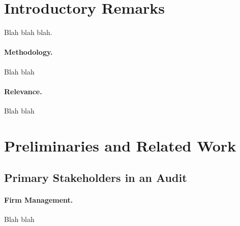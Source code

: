 \section{Introductory Remarks}

Blah blah blah.

 



\paragraph{\textbf{Methodology.}}  Blah blah
%
%
%
%
%

\paragraph{\textbf{Relevance.}} Blah blah

\section{Preliminaries and Related Work}




\subsection{Primary Stakeholders in an Audit}


\paragraph{Firm Management.}  Blah blah



